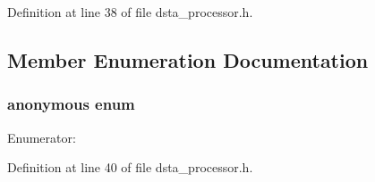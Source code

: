 Definition at line 38 of file dsta\_\-processor.h.



\subsection{Member Enumeration Documentation}
\hypertarget{classmocha_1_1_dsta_processor_a0ecba8d2e7294167a260e88c483dce23}{
\subsubsection[{"@14}]{\setlength{\rightskip}{0pt plus 5cm}anonymous enum}}
\label{classmocha_1_1_dsta_processor_a0ecba8d2e7294167a260e88c483dce23}
\begin{Desc}
\item[Enumerator: ]\par
\begin{description}
\item[{\em 
\hypertarget{classmocha_1_1_dsta_processor_a0ecba8d2e7294167a260e88c483dce23af842955727018749f76b8e706b34effa}{
kSuccess}
\label{classmocha_1_1_dsta_processor_a0ecba8d2e7294167a260e88c483dce23af842955727018749f76b8e706b34effa}
}]\item[{\em 
\hypertarget{classmocha_1_1_dsta_processor_a0ecba8d2e7294167a260e88c483dce23a5471824fb66c1ace1bee0f9c6ae843ae}{
kError}
\label{classmocha_1_1_dsta_processor_a0ecba8d2e7294167a260e88c483dce23a5471824fb66c1ace1bee0f9c6ae843ae}
}]\end{description}
\end{Desc}



Definition at line 40 of file dsta\_\-processor.h.



